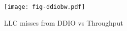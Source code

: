 \begin{figure}[t]
\texttt{[image: fig-ddiobw.pdf]}
\caption{LLC misses from DDIO vs Throughput}
\label{fig:membw}
\end{figure}
